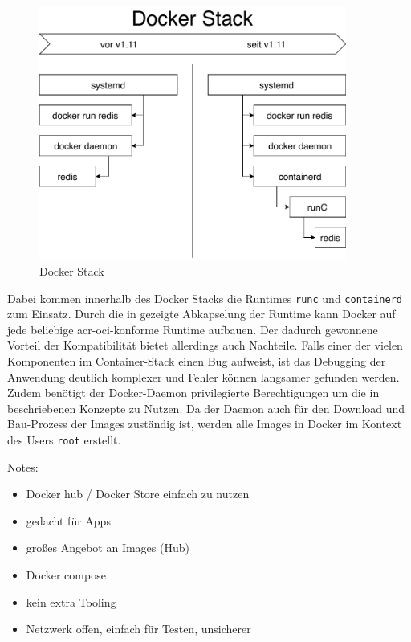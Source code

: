 \begin{figure}[h]
	\begin{center}
		\includegraphics[width=0.9\textwidth]{bilder/docker-stack-containerd-runc.pdf}
		\caption{Docker Stack}
		\label{fig:dockerStack}		
	\end{center}
\end{figure}

Dabei kommen innerhalb des Docker Stacks die Runtimes \texttt{runc} und \texttt{containerd} zum Einsatz. Durch die in  gezeigte Abkapselung der Runtime kann Docker auf jede beliebige \gls{acr-oci}-konforme Runtime aufbauen. Der dadurch gewonnene Vorteil der Kompatibilität bietet allerdings auch Nachteile. Falls einer der vielen Komponenten im Container-Stack einen Bug aufweist, ist das Debugging der Anwendung deutlich komplexer und Fehler können langsamer gefunden werden. Zudem benötigt der Docker-Daemon privilegierte Berechtigungen um die in  beschriebenen Konzepte zu Nutzen. Da der Daemon auch für den Download und Bau-Prozess der Images zuständig ist, werden alle Images in Docker im Kontext des Users \texttt{root} erstellt.

Notes:
\begin{itemize}
	\item Docker hub / Docker Store einfach zu nutzen
	\item gedacht für Apps
	\item großes Angebot an Images (Hub)
	\item Docker compose
	\item kein extra Tooling
	\item Netzwerk offen, einfach für Testen, unsicherer
\end{itemize}

